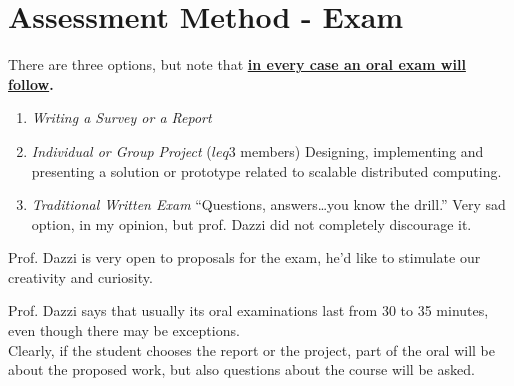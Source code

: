 \section{Assessment Method - Exam}
There are three options, but note that
\textbf{\ul{in every case an oral exam will follow}.}
\begin{enumerate}
   \item \textit{Writing a Survey or a Report}
   \item \textit{Individual or Group Project} ($leq 3$ members)
   Designing, implementing and presenting a solution or prototype related to scalable distributed computing.
   \item \textit{Traditional Written Exam}
   ``Questions, answers\dots you know the drill.''
   Very sad option, in my opinion, but prof. Dazzi did not completely discourage it.
\end{enumerate}
Prof. Dazzi is very open to proposals for the exam, he'd like to stimulate our creativity and curiosity.

Prof. Dazzi says that usually its oral examinations last from 30 to 35 minutes, even though there may be exceptions.\\
Clearly, if the student chooses the report or the project, part of the oral will be about the proposed work, but also questions about the course will be asked.